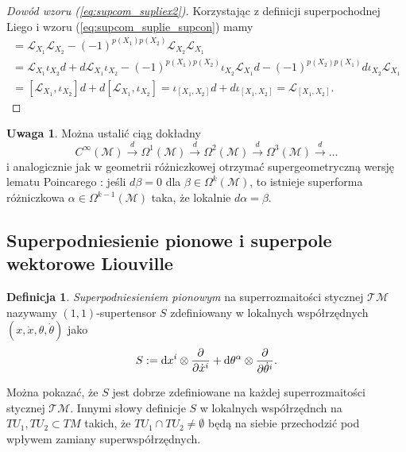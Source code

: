 \documentclass[11pt,a4paper]{report}
\theoremstyle{definition}
\newtheorem{definition}[theorem]{Definicja}
\newtheorem{remark}[theorem]{Uwaga}
\begin{document}
\begin{proof}[Dowód wzoru (\ref{eq:supcom_supliex2})]
	Korzystając z definicji superpochodnej Liego i wzoru (\ref{eq:supcom_suplie_supcon}) mamy
	\begin{multline}
		[\mathcal{L}_{X_1},\mathcal{L}_{X_2}]= \mathcal{L}_{X_1}\mathcal{L}_{X_2}-(-1)^{p(X_1)p(X_2)}\mathcal{L}_{X_2}\mathcal{L}_{X_1}
		\\ =\mathcal{L}_{X_1}\iota_{X_2}d + d\mathcal{L}_{X_1}\iota_{X_2}-(-1)^{p(X_1)p(X_2)}\iota_{X_2}\mathcal{L}_{X_1}d-(-1)^{p(X_2)p(X_1)}d\iota_{X_2}\mathcal{L}_{X_1} \\
		= [\mathcal{L}_{X_1},\iota_{X_2}] d+d [\mathcal{L}_{X_1},\iota_{X_2}] = \iota_{[X_1,X_2]} d+d \iota_{[X_1,X_2]} = \mathcal{L}_{[X_1,X_2]}.
	\end{multline}
\end{proof}
			      				
\begin{remark}
	Można ustalić ciąg dokładny
	\begin{equation*}
		C^\infty(\mathcal{M}) \stackrel{d}{\rightarrow} \Omega^1(\mathcal{M}) \stackrel{d}{\rightarrow}\Omega^2(\mathcal{M}) \stackrel{d}{\rightarrow} \Omega^3(\mathcal{M})\stackrel{d}{\rightarrow}\ldots
	\end{equation*}
	i analogicznie jak w geometrii różniczkowej otrzymać supergeometryczną wersję lematu Poincarego \cite{bartocci}: jeśli $d\beta = 0$ dla $\beta \in \Omega^k (\mathcal{M})$, to istnieje superforma różniczkowa $\alpha \in \Omega^{k-1}(\mathcal{M})$ taka, że lokalnie $d\alpha = \beta$.
\end{remark}
			      				
\subsection{Superpodniesienie pionowe i superpole wektorowe Liouville}
\begin{definition}
	\textit{Superpodniesieniem pionowym} na superrozmaitości stycznej $\mathcal{TM}$ nazywamy $(1,1)$-supertensor $S$ zdefiniowany w lokalnych współrzędnych $(x, \dot x, \theta, \dot \theta)$ jako
	\begin{equation*}
		S:={\rm d}x^i\otimes \frac{\partial}{\partial \dot x^i}+{\rm d}\theta^\alpha\otimes \frac{\partial}{\partial \dot\theta^i}.
	\end{equation*}
\end{definition}
			      				
Można pokazać, że $S$ jest dobrze zdefiniowane na każdej superrozmaitości stycznej $\mathcal{TM}$. Innymi słowy definicje $S$ w lokalnych współrzędnch na $TU_1, TU_2 \subset TM$ takich, że $TU_1\cap TU_2 \neq \emptyset$ będą na siebie przechodzić pod wpływem zamiany superwspółrzędnych.
			      				 
\end{document}
